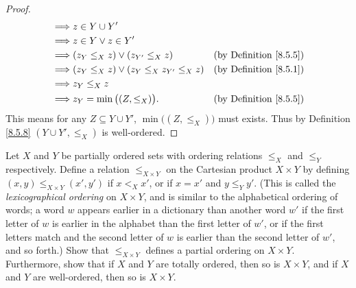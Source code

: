 \begin{proof}
\begin{align*}
        \implies & z \in Y \cup Y'                                                                       \\
        \implies & z \in Y \lor z \in Y'                                                                 \\
        \implies & (z_Y \leq_X z) \lor (z_{Y'} \leq_X z)            & \text{(by Definition \ref{8.5.5})} \\
        \implies & (z_Y \leq_X z) \lor (z_Y \leq_X z_{Y'} \leq_X z) & \text{(by Definition \ref{8.5.1})} \\
        \implies & z_Y \leq_X z                                                                          \\
        \implies & z_Y = \min\big((Z, \leq_X)\big).                 & \text{(by Definition \ref{8.5.5})}
    \end{align*}
    This means for any \(Z \subseteq Y \cup Y'\), \(\min\big((Z, \leq_X)\big)\) must exists.
    Thus by Definition \ref{8.5.8} \((Y \cup Y', \leq_X)\) is well-ordered.
\end{proof}

\begin{exercise}\label{ex 8.5.12}
    Let \(X\) and \(Y\) be partially ordered sets with ordering relations \(\leq_X\) and \(\leq_Y\) respectively.
    Define a relation \(\leq_{X \times Y}\) on the Cartesian product \(X \times Y\) by defining \((x, y) \leq_{X \times Y} (x', y')\) if \(x <_X x'\), or if \(x = x'\) and \(y \leq_Y y'\).
    (This is called the \emph{lexicographical ordering} on \(X \times Y\), and is similar to the alphabetical ordering of words;
    a word \(w\) appears earlier in a dictionary than another word \(w'\) if the first letter of \(w\) is earlier in the alphabet than the first letter of \(w'\), or if the first letters match and the second letter of \(w\) is earlier than the second letter of \(w'\), and so forth.)
    Show that \(\leq_{X \times Y}\) defines a partial ordering on \(X \times Y\).
    Furthermore, show that if \(X\) and \(Y\) are totally ordered, then so is \(X \times Y\), and if \(X\) and \(Y\) are well-ordered, then so is \(X \times Y\).
\end{exercise}


